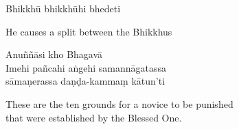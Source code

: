 Bhikkhū bhikkhūhi bhedeti

\begin{cprenglish}
  He causes a split between the Bhikkhus
\end{cprenglish}

Anuññāsi kho Bhagavā\\
Imehi pañcahi aṅgehi samannāgatassa\\
sāmaṇerassa daṇḍa-kammaṃ kātun'ti

\begin{cprenglish}
  These are the ten grounds for a novice to be punished\\
  that were established by the Blessed One.
\end{cprenglish}


